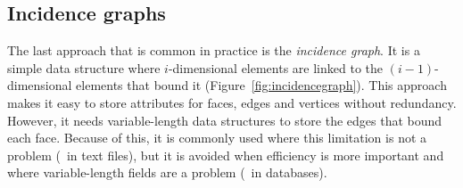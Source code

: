 \subsection{Incidence graphs}

The last approach that is common in practice is the \emph{incidence graph}.
It is a simple data structure where \(i\)-dimensional elements are linked to the \((i-1)\)-dimensional elements that bound it (Figure~\ref{fig:incidencegraph}).
This approach makes it easy to store attributes for faces, edges and vertices without redundancy.
However, it needs variable-length data structures to store the edges that bound each face.
Because of this, it is commonly used where this limitation is not a problem (\eg\ in text files), but it is avoided when efficiency is more important and where variable-length fields are a problem (\eg\ in databases).

